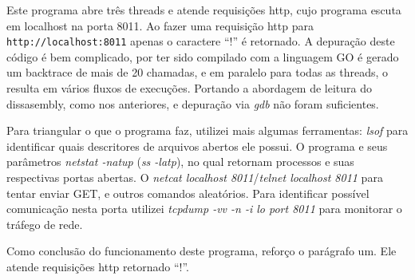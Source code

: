 \par Este programa abre três threads e atende requisições http,
cujo programa escuta em localhost na porta 8011. Ao fazer uma
requisição http para \texttt{http://localhost:8011} apenas o caractere
``!'' é retornado. A depuração deste código é bem complicado, por ter
sido compilado com a linguagem GO é gerado um backtrace de mais de 20
chamadas, e em paralelo para todas as threads, o resulta em vários
fluxos de execuções. Portando a abordagem de leitura do dissasembly,
como nos anteriores, e depuração via \emph{gdb} não foram
suficientes.

Para triangular o que o programa faz, utilizei mais algumas
ferramentas: \emph{lsof} para identificar quais descritores de
arquivos abertos ele possui. O programa e seus parâmetros \emph{netstat -natup}
(\emph{ss -latp}), no qual retornam processos e suas respectivas portas
abertas. O \emph{netcat localhost 8011}/\emph{telnet localhost 8011}
para tentar enviar GET, e outros comandos aleatórios. Para identificar
possível comunicação nesta porta utilizei \emph{tcpdump -vv -n -i lo
  port 8011} para monitorar o tráfego de rede.

Como conclusão do funcionamento deste programa, reforço o parágrafo
um. Ele atende requisições http retornado ``!''.
